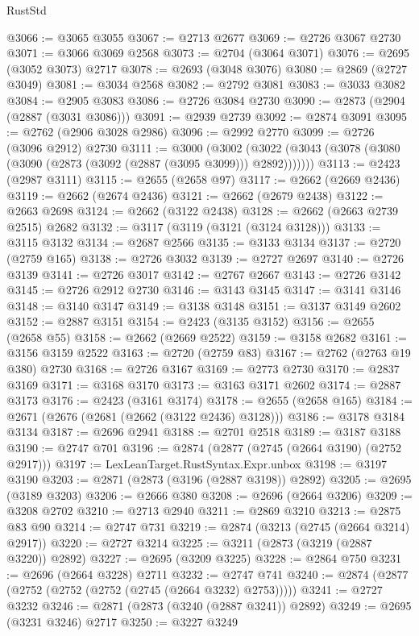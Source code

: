 \begin{lexlean}{RustStd}
\begin{coremodule}
@3066 := @3065 @3055
@3067 := @2713 @2677
@3069 := @2726 @3067 @2730
@3071 := @3066 @3069 @2568
@3073 := @2704 (@3064 @3071)
@3076 := @2695 (@3052 @3073) @2717
@3078 := @2693 (@3048 @3076)
@3080 := @2869 (@2727 @3049)
@3081 := @3034 @2568
@3082 := @2792 @3081
@3083 := @3033 @3082
@3084 := @2905 @3083
@3086 := @2726 @3084 @2730
@3090 := @2873 (@2904 (@2887 (@3031 @3086)))
@3091 := @2939 @2739
@3092 := @2874 @3091
@3095 := @2762 (@2906 @3028 @2986)
@3096 := @2992 @2770
@3099 := @2726 (@3096 @2912) @2730
@3111 := @3000
    (@3002 (@3022 (@3043 (@3078 (@3080 (@3090 (@2873 (@3092 (@2887 (@3095 @3099))) @2892)))))))
@3113 := @2423 (@2987 @3111)
@3115 := @2655 (@2658 @97)
@3117 := @2662 (@2669 @2436)
@3119 := @2662 (@2674 @2436)
@3121 := @2662 (@2679 @2438)
@3122 := @2663 @2698
@3124 := @2662 (@3122 @2438)
@3128 := @2662 (@2663 @2739 @2515) @2682
@3132 := @3117 (@3119 (@3121 (@3124 @3128)))
@3133 := @3115 @3132
@3134 := @2687 @2566
@3135 := @3133 @3134
@3137 := @2720 (@2759 @165)
@3138 := @2726 @3032
@3139 := @2727 @2697
@3140 := @2726 @3139
@3141 := @2726 @3017
@3142 := @2767 @2667
@3143 := @2726 @3142
@3145 := @2726 @2912 @2730
@3146 := @3143 @3145
@3147 := @3141 @3146
@3148 := @3140 @3147
@3149 := @3138 @3148
@3151 := @3137 @3149 @2602
@3152 := @2887 @3151
@3154 := @2423 (@3135 @3152)
@3156 := @2655 (@2658 @55)
@3158 := @2662 (@2669 @2522)
@3159 := @3158 @2682
@3161 := @3156 @3159 @2522
@3163 := @2720 (@2759 @83)
@3167 := @2762 (@2763 @19 @380) @2730
@3168 := @2726 @3167
@3169 := @2773 @2730
@3170 := @2837 @3169
@3171 := @3168 @3170
@3173 := @3163 @3171 @2602
@3174 := @2887 @3173
@3176 := @2423 (@3161 @3174)
@3178 := @2655 (@2658 @165)
@3184 := @2671 (@2676 (@2681 (@2662 (@3122 @2436) @3128)))
@3186 := @3178 @3184 @3134
@3187 := @2696 @2941
@3188 := @2701 @2518
@3189 := @3187 @3188
@3190 := @2747 @701
@3196 := @2874 (@2877 (@2745 (@2664 @3190) (@2752 @2917)))
@3197 := LexLeanTarget.RustSyntax.Expr.unbox
@3198 := @3197 @3190
@3203 := @2871 (@2873 (@3196 (@2887 @3198)) @2892)
@3205 := @2695 (@3189 @3203)
@3206 := @2666 @380
@3208 := @2696 (@2664 @3206)
@3209 := @3208 @2702
@3210 := @2713 @2940
@3211 := @2869 @3210
@3213 := @2875 @83 @90
@3214 := @2747 @731
@3219 := @2874 (@3213 (@2745 (@2664 @3214) @2917))
@3220 := @2727 @3214
@3225 := @3211 (@2873 (@3219 (@2887 @3220)) @2892)
@3227 := @2695 (@3209 @3225)
@3228 := @2864 @750
@3231 := @2696 (@2664 @3228) @2711
@3232 := @2747 @741
@3240 := @2874 (@2877 (@2752 (@2752 (@2752 (@2745 (@2664 @3232) @2753)))))
@3241 := @2727 @3232
@3246 := @2871 (@2873 (@3240 (@2887 @3241)) @2892)
@3249 := @2695 (@3231 @3246) @2717
@3250 := @3227 @3249

\end{coremodule}
\end{lexlean}
